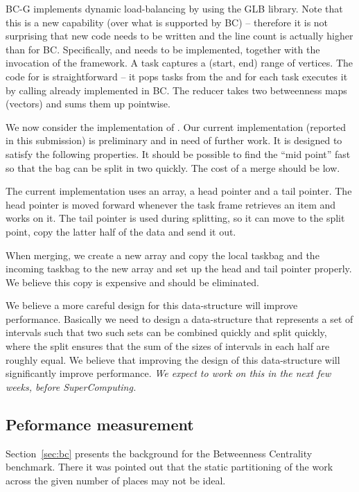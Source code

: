 
BC-G implements dynamic load-balancing by using the GLB library. Note
that this is a new capability (over what is supported by BC) -- therefore it is not surprising that
new code needs to be written and the line count is actually higher
than for BC. Specifically,  and 
needs to be implemented, together with the invocation of the
 framework. A task captures a (start, end) range of
vertices. The code for  is
straightforward -- it pops tasks from the  and for
each task executes it by calling  already
implemented in BC. The reducer takes two betweenness maps (vectors) and sums
them up pointwise.

We now consider the implementation of . Our current
implementation (reported in this submission) is preliminary and in
need of further work. It is designed to satisfy the following
properties. It should be possible to find the ``mid point'' fast so
that the bag can be split in two quickly. The cost of a merge should
be low. 

The current implementation uses an array, a head pointer and a tail
pointer. The head pointer is moved forward whenever the task frame
retrieves an item and works on it. The tail pointer is used during
splitting, so it can move to the split point, copy the latter half of
the data and send it out. 

When merging, we create a new array and copy the local taskbag and the
incoming taskbag to the new array and set up the head and tail pointer
properly. We believe this copy is expensive and should be eliminated.

We believe a more careful design for this data-structure will improve
performance. Basically we need to design a data-structure that
represents a set of intervals such that two such sets can be combined
quickly and split quickly, where the split ensures that the sum of the
sizes of intervals in each half are roughly equal.  We believe that
improving the design of this data-structure will significantly improve
performance. {\em We expect to work on this in the next few
  weeks, before SuperComputing.}

\subsection{Peformance measurement}

Section~\ref{sec:bc} presents the background for the Betweenness
Centrality benchmark. There it was pointed out that the static
partitioning of the work across the given number of places may not be
ideal.  

